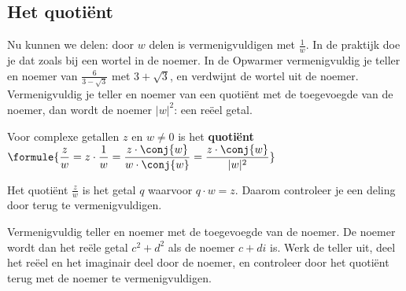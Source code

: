\begin{oefeningen}
\end{oefeningen}

\subsection{Het quotiënt}

Nu kunnen we delen: door $w$ delen is vermenigvuldigen met $\frac{1}{w}$. In de praktijk doe je dat zoals bij een wortel in de noemer. In de Opwarmer vermenigvuldig je teller en noemer van $\frac{6}{3 - \sqrt3}$ met $3 + \sqrt3$, en verdwijnt de wortel uit de noemer. Vermenigvuldig je teller en noemer van een quotiënt met de toegevoegde van de noemer, dan wordt de noemer $|w|^2$: een reëel getal.

\begin{theorie}
Voor complexe getallen $z$ en $w \neq 0$ is het \textbf{\textcolor{accent}{quotiënt}} \quad $\formule{\dfrac{z}{w} = z \cdot \dfrac{1}{w} = \dfrac{z \cdot \conj{w}}{w \cdot \conj{w}} = \dfrac{z \cdot \conj{w}}{|w|^2}}$
\end{theorie}

Het quotiënt $\frac{z}{w}$ is het getal $q$ waarvoor $q \cdot w = z$. Daarom controleer je een deling door terug te vermenigvuldigen.


\begin{werkwijze}
Vermenigvuldig teller en noemer met de toegevoegde van de noemer. De noemer wordt dan het reële getal $c^2 + d^2$ als de noemer $c + di$ is. Werk de teller uit, deel het reëel en het imaginair deel door de noemer, en controleer door het quotiënt terug met de noemer te vermenigvuldigen.
\end{werkwijze}

